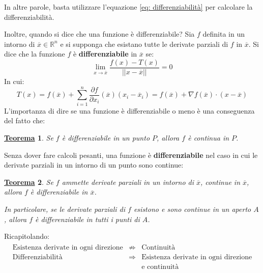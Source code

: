 \documentclass[a4paper]{article}
\newtheorem{theorem}{\textcolor{Red3}{\underline{Teorema}}}
\newcommand{\definition}[1]{\textcolor{Red3}{\textbf{#1}}}
\begin{document}
	\noindent
	In altre parole, basta utilizzare l'equazione \ref{eq: differenziabilità} per calcolare la differenziabilità.\newline

	\noindent
	Inoltre, quando si dice che una funzione è differenziabile? Sia $f$ definita in un intorno di $\overline{x} \in \mathbb{R}^{n}$ e si supponga che esistano tutte le derivate parziali di $f$ in $\overline{x}$. Si dice che la funzione $f$ è \definition{differenziabile} in $\overline{x}$ se:
	\begin{equation*}
		\displaystyle\lim_{x \rightarrow \overline{x}} \dfrac{f\left(x\right) - T\left(x\right)}{\left|\left| x-\overline{x} \right|\right|} = 0
	\end{equation*}
	In cui:
	\begin{equation*}
		T\left(x\right) = f\left(\overline{x}\right) + \displaystyle\sum_{i=1}^{n}\dfrac{\partial f}{\partial x_{i}} \left(\overline{x}\right)\left(x_{i} - \overline{x}_{i}\right) = f\left(\overline{x}\right) + \nabla f\left(\overline{x}\right) \cdot \left(x-\overline{x}\right)
	\end{equation*}
	L'importanza di dire se una funzione è differenziabile o meno è una conseguenza del fatto che:
	\begin{theorem}
		Se $f$ è differenziabile in un punto $P$, allora $f$ è continua in $P$.
	\end{theorem}

	\noindent
	Senza dover fare calcoli pesanti, una funzione è \textbf{differenziabile} nel caso in cui le derivate parziali in un intorno di un punto sono continue:
	\begin{theorem}
		Se $f$ ammette derivate parziali in un intorno di $\overline{x}$, continue in $\overline{x}$, allora $f$ è differenziabile in $\overline{x}$.

		In particolare, se le derivate parziali di $f$ esistono e sono continue in un aperto $A$, allora $f$ è differenziabile in tutti i punti di $A$.
	\end{theorem}

	\noindent
	Ricapitolando:
	\begin{gather*}
		\begin{array}{rcl}
			\text{Esistenza derivate in ogni direzione} &\nRightarrow& \text{Continuità} \\ [.3em]
			\text{Differenziabilità} &\Rightarrow& \text{Esistenza derivate in ogni direzione} \\
			&& \text{e continuità}
		\end{array}
	\end{gather*}\newpage
	
\end{document}
